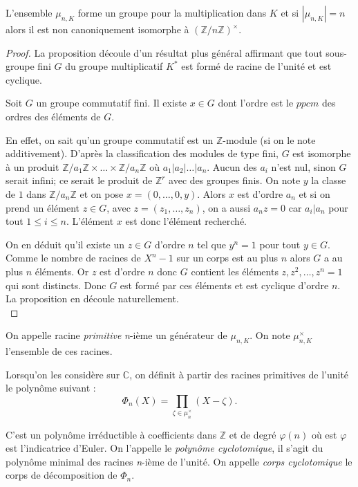 \documentclass[a4paper]{article} %
\numberwithin{section}{part}
\numberwithin{equation}{section}
\newcommand\nroot[1]{\textit{#1}-ième}
\newcommand\zmodn[1]{\mathbb{Z}/#1\mathbb{Z}}
\newcommand\zmodninv[1]{(\mathbb{Z}/#1\mathbb{Z})^{\times}}
\newcommand\ZZ{\mathbb{Z}}
\newcommand\CC{\mathbb{C}}
\begin{document}
\begin{prop}
\label{prop:rootcycl}
L'ensemble $\mu_{n,K}$ forme un groupe pour la multiplication dans $K$ et si 
$|\mu_{n,K}| = n$ alors il est non canoniquement isomorphe à $\zmodninv{n}$.
\end{prop}
\begin{proof}
La proposition découle d'un résultat plus général affirmant que tout sous-groupe
fini $G$ du groupe multiplicatif $K^*$ est formé de racine de l'unité et est 
cyclique. 
\begin{lem}
Soit $G$ un groupe commutatif fini. Il existe $x\in G$ dont l'ordre est le 
$ppcm$ des ordres des éléments de $G$.
\end{lem}
En effet, on sait qu'un groupe commutatif est un $\ZZ$-module (si on le note 
additivement). D'après la classification des modules de type fini, $G$ est 
isomorphe à un produit $\zmodn{a_1}\times\dots\times\zmodn{a_n}$ où 
$a_1|a_2|\dots|a_n$. Aucun des $a_i$ n'est nul, sinon $G$ serait infini; 
ce serait le produit de $\ZZ^r$ avec des groupes finis. On note $y$ la classe 
de $1$ dans $\zmodn{a_n}$ et on pose $x = (0,\dots,0,y)$. Alors $x$ est d'ordre 
$a_n$ et si on prend un élément $z\in G$, avec $z = (z_1,\dots,z_n)$, on a aussi
$a_nz = 0$ car $a_i|a_n$ pour tout $1\leq i \leq n$. L'élément $x$ est donc
l'élément recherché.\par
On en déduit qu'il existe un $z\in G$ d'ordre $n$ tel que $y^n = 1$ pour 
tout $y\in G$. Comme le nombre de racines de $X^n - 1$ sur un corps est au plus 
$n$ alors $G$ a au plus $n$ éléments. Or $z$ est d'ordre $n$ donc $G$ contient 
les éléments $z, z^2,\dots,z^n = 1$ qui sont distincts. Donc $G$ est formé par 
ces éléments et est cyclique d'ordre $n$. La proposition en découle 
naturellement.\\
\end{proof}

\begin{defn}
On appelle racine \emph{primitive} \nroot{n} un générateur de $\mu_{n,K}$. On 
note $\mu_{n,K}^{\times}$ l'ensemble de ces racines.
\end{defn}

Lorsqu'on les considère sur $\CC$, on définit à partir des racines primitives de
l'unité le polynôme suivant :
\begin{equation}
\Phi_n(X) = \prod_{\zeta\in \mu_n^{\times}}{(X - \zeta)}.
\end{equation}

C'est un polynôme irréductible à coefficients dans $\ZZ$ et de degré
$\varphi(n)$ où est $\varphi$ est l'indicatrice d'Euler. On l'appelle le
\emph{polynôme cyclotomique}, il s'agit du polynôme minimal des racines
\nroot{n} de l'unité. On appelle \emph{corps cyclotomique} le corps
de décomposition de $\Phi_n$.
\end{document}
